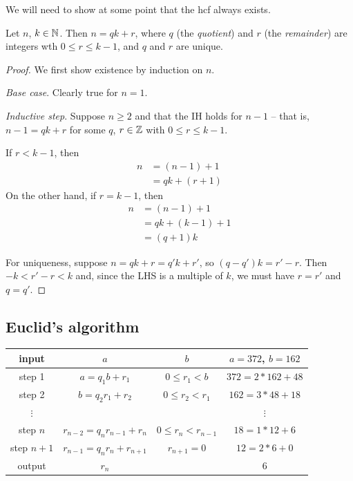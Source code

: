 \documentclass{../../template/note}
\begin{document}
    We will need to show at some point that the hcf always exists.

    \begin{proposition}
        Let \(n\), \(k \in \mathbb N\). Then \(n = qk + r\), where \(q\) (the \emph{quotient}) and \(r\) (the \emph{remainder}) are integers wth \(0 \leq r \leq k-1\), and \(q\) and \(r\) are unique.
    \end{proposition}
    
    \begin{proof}
        We first show existence by induction on \(n\).

        \emph{Base case}. Clearly true for \(n=1\).

        \emph{Inductive step}. Suppose \(n \geq 2\) and that the IH holds for \(n-1\) -- that is, \(n-1=qk+r\) for some \(q\), \(r \in \mathbb Z\) with \(0 \leq r \leq k-1\).

        If \(r < k-1\), then
        \begin{align*}
            n &= (n-1) + 1 \\
            &= qk + (r + 1)
        \end{align*}
        On the other hand, if \(r = k-1\), then
        \begin{align*}
            n &= (n-1) + 1 \\
            &= qk + (k-1) + 1 \\
            &= (q+1)k
        \end{align*}

        For uniqueness, suppose \(n = qk + r = q'k + r'\), so \((q-q')k = r'-r\). Then \(-k < r'-r < k\) and, since the LHS is a multiple of \(k\), we must have \(r = r'\) and \(q = q'\).
    \end{proof}
    
    \subsection{Euclid's algorithm}

    \begin{center}
        \begin{tabular}{c | c c | c}
            input & \(a\) & \(b\) & \(a=372\), \(b=162\) \\
            \hline
            step 1 & \(a=q_1b + r_1\) & \(0 \leq r_1 < b\) & \(372 = 2 * 162 + 48\) \\
            step 2 & \(b=q_2r_1 + r_2\) & \(0 \leq r_2 < r_1\) & \(162 = 3 * 48 + 18\) \\
            \(\vdots\) & & & \(\vdots\) \\
            step \(n\) & \(r_{n-2}=q_nr_{n-1} + r_n\) & \(0 \leq r_n < r_{n-1}\) & \(18 = 1 * 12 + 6\) \\
            step \(n+1\) & \(r_{n-1}=q_nr_n + r_{n+1}\) & \(r_{n+1}=0\) & \(12 = 2 * 6 + 0\) \\
            \hline
            output & \(r_n\) & & 6
        \end{tabular}
        
        
    \end{center}
\end{document}
